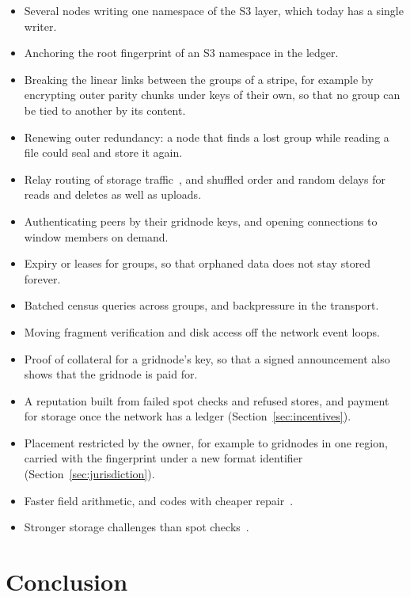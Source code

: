 \documentclass[10pt,a4paper,final]{article}
\begin{document}
\begin{itemize}
	\item Several nodes writing one namespace of the S3 layer, which today has a single writer.
	\item Anchoring the root fingerprint of an S3 namespace in the ledger.
	\item Breaking the linear links between the groups of a stripe, for example by encrypting outer parity chunks
	      under keys of their own, so that no group can be tied to another by its content.
	\item Renewing outer redundancy: a node that finds a lost group while reading a file could seal and store it
	      again.
	\item Relay routing of storage traffic~\cite{dingledine2004}, and shuffled order and random delays for reads and
	      deletes as well as uploads.
	\item Authenticating peers by their gridnode keys, and opening connections to window members on demand.
	\item Expiry or leases for groups, so that orphaned data does not stay stored forever.
	\item Batched census queries across groups, and backpressure in the transport.
	\item Moving fragment verification and disk access off the network event loops.
	\item Proof of collateral for a gridnode's key, so that a signed announcement also shows that the gridnode is
	      paid for.
	\item A reputation built from failed spot checks and refused stores, and payment for storage once the network
	      has a ledger (Section~\ref{sec:incentives}).
	\item Placement restricted by the owner, for example to gridnodes in one region, carried with the fingerprint
	      under a new format identifier (Section~\ref{sec:jurisdiction}).
	\item Faster field arithmetic, and codes with cheaper repair~\cite{dimakis2010}.
	\item Stronger storage challenges than spot checks~\cite{ateniese2007,juels2007}.
\end{itemize}

\section{Conclusion}
\label{sec:conclusion}
\end{document}
